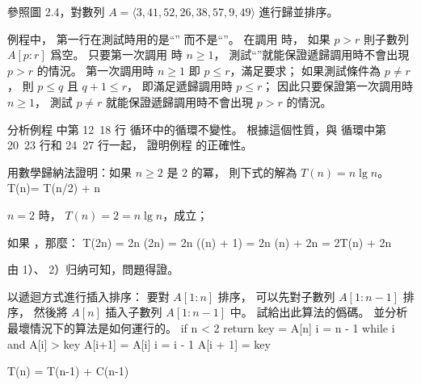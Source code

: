 \startsection[
  title={Designing algorithms},
]

\startEXERCISE
參照圖 2.4，對數列 $A=\langle 3,41,52,26,38,57,9,49\rangle$ 進行歸並排序。
\stopEXERCISE
\startANSWER
\externalfigure[output/e2_3_1-1]
\stopANSWER

\startEXERCISE
{} 例程中，
第一行在測試時用的是“” 而不是“”。
在調用  時，
如果 $p>r$ 則子數列 $A[p:r]$ 爲空。
只要第一次調用  時 $n\ge 1$，
測試“”就能保證遞歸調用時不會出現 $p>r$ 的情況。
\stopEXERCISE
\startANSWER
第一次調用時 $n\ge 1$ 即 $p\le r$，滿足要求；
如果測試條件為 $p\ne r$，
則 $p\le q$ 且 $q+1\le r$，
即滿足遞歸調用時 $p\le r$；
因此只要保證第一次調用時 $n\ge 1$，
測試 $p\ne r$ 就能保證遞歸調用時不會出現 $p>r$ 的情況。
\stopANSWER

\startEXERCISE
分析例程  中第 12~18 行  循环中的循環不變性。
根據這個性質，與  循環中第 20~23 行和 24~27 行一起，
證明例程  的正確性。
\stopEXERCISE
\startANSWER
{}
\stopANSWER

\startEXERCISE
用數學歸納法證明：如果 $n\ge 2$ 是 $2$ 的冪，
則下式的解為 $T(n)=n\lg n$。
\startformula
T(n)=\startmathcases
{} \NC {}\NR
{} T(n/2) + n \NC {} \NR
\stopmathcases
\stopformula
\stopEXERCISE

\startANSWER
\startigBase[n]
\item $n=2$ 時， $T(n)=2=n\lg n$，成立；
\item 如果 ，那麼：
\startformula\startalign
\NC T(2n) \NC = 2n \lg(2n) \NR
\NC       \NC = 2n (\lg(n) + 1) \NR
\NC	      \NC = 2n \lg(n) + 2n \NR
\NC	      \NC = 2T(n) + 2n \NR
\stopalign\stopformula
\item 由 1）、 2）归纳可知，問題得證。
\stopigBase
\stopANSWER

\startEXERCISE
以遞迴方式進行插入排序：
要對 $A[1:n]$ 排序，
可以先對子數列 $A[1:n-1]$ 排序，
然後將 $A[n]$ 插入子數列 $A[1:n-1]$ 中。
試給出此算法的僞碼。
並分析最壞情況下的算法是如何運行的。
\stopEXERCISE
\startANSWER
{}
\startCLRSCODE
if n < 2
	return
key = A[n]
i = n - 1
while i  and A[i] > key
	A[i+1] = A[i]
	i = i - 1
A[i + 1] = key
\stopCLRSCODE

\startformula
T(n) = \startmathcases
{} \NC {} \NR
\NC T(n-1) + C(n-1)	\NC {} \NR
\stopmathcases
\stopformula

